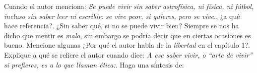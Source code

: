 \documentclass[10pt,addpoints]{exam}
\begin{document}
\begin{questions}
  \question
  Cuando el autor menciona: \emph{Se puede vivir sin saber astrofísica, ni física, ni fútbol, incluso sin saber leer ni escribir: se vive peor, si quieres, pero se vive.}, ¿a qué hace referencia?. ¿Sin saber qué, si no se puede vivir bien?\vspace{1.25in}
  \question
  Siempre se nos ha dicho que mentir es \emph{malo}, sin embargo se podría decir que en ciertas ocasiones es bueno. Mencione algunas
  \newpage
  \question ¿Por qué el autor habla de la \emph{libertad} en el capítulo 1?.\vspace{1.25in}
  \question Explique a qué se refiere el autor cuando dice: \emph{A ese saber vivir, o ``arte de vivir'' si prefieres, es a lo que llaman ética:}.\vspace{1.25in}
  \question
  Haga una síntesis de:
\end{questions}
\end{document}
